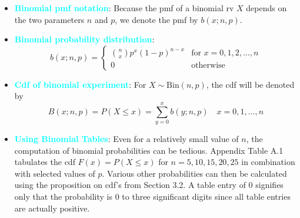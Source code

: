 \documentclass{report}
\begin{document}
\begin{itemize}
    \item \textbf{\textcolor{cyan}{Binomial pmf notation}}: Because the pmf of a binomial rv $X$ depends on the two parameters $n$ and $p$, we denote the pmf by $b(x; n, p)$.
    \item \textbf{\textcolor{cyan}{Binomial probability distribution}}:
        \[
            b(x; n, p) =
            \begin{cases} 
                \binom{n}{x} p^x (1 - p)^{n - x} & \text{for } x = 0, 1, 2, \ldots, n \\
                0 & \text{otherwise}
            \end{cases}
        \]
    \item \textbf{\textcolor{cyan}{Cdf of binomial experiment}}:
        For \( X \sim \text{Bin}(n, p) \), the cdf will be denoted by
        \[
            B(x; n, p) = P(X \leq x) = \sum_{y=0}^{x} b(y; n, p) \quad x = 0, 1, \ldots, n
        \]
    \item \textbf{\textcolor{cyan}{Using Binomial Tables}}:
        Even for a relatively small value of \( n \), the computation of binomial probabilities can be tedious. Appendix Table A.1 tabulates the cdf \( F(x) = P(X \leq x) \) for \( n = 5, 10, 15, 20, 25 \) in combination with selected values of \( p \). Various other probabilities can then be calculated using the proposition on cdf’s from Section 3.2. A table entry of 0 signifies only that the probability is 0 to three significant digits since all table entries are actually positive.
        \bigbreak \noindent 
        \bigbreak \noindent 


\end{itemize}
\end{document}
